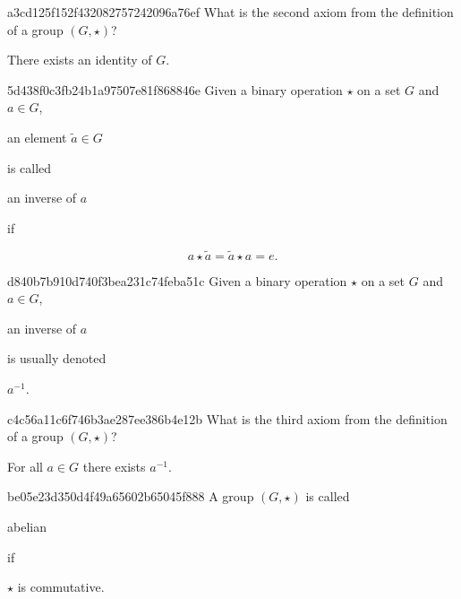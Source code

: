 \begin{note}{a3cd125f152f432082757242096a76ef}
    What is the second axiom from the definition of a group \({ (G, \star) }\)?

    \begin{cloze}{1}
        There exists an identity of \({ G }\).
    \end{cloze}
\end{note}

\begin{note}{5d438f0c3fb24b1a97507e81f868846e}
    Given a binary operation \({ \star }\) on a set \({ G }\) and \({ a \in G }\), \begin{icloze}{3}an element \({ \tilde a \in G }\)\end{icloze} is called \begin{icloze}{2}an inverse of \({ a }\)\end{icloze} if
    \begin{icloze}{1}
        \[
            a \star \tilde a = \tilde a \star a = e.
        \]
    \end{icloze}
\end{note}

\begin{note}{d840b7b910d740f3bea231c74feba51c}
    Given a binary operation \({ \star }\) on a set \({ G }\) and \({ a \in G }\), \begin{icloze}{2}an inverse of \({ a }\)\end{icloze} is usually denoted \begin{icloze}{1}\({ a^{-1} }\).\end{icloze}
\end{note}

\begin{note}{c4c56a11c6f746b3ae287ee386b4e12b}
    What is the third axiom from the definition of a group \({ (G, \star) }\)?

    \begin{cloze}{1}
        For all \({ a \in G }\) there exists \({ a^{-1} }\).
    \end{cloze}
\end{note}

\begin{note}{be05e23d350d4f49a65602b65045f888}
    A group \({ (G, \star) }\) is called \begin{icloze}{2}abelian\end{icloze} if \begin{icloze}{1}\({ \star }\) is commutative.\end{icloze}
\end{note}

